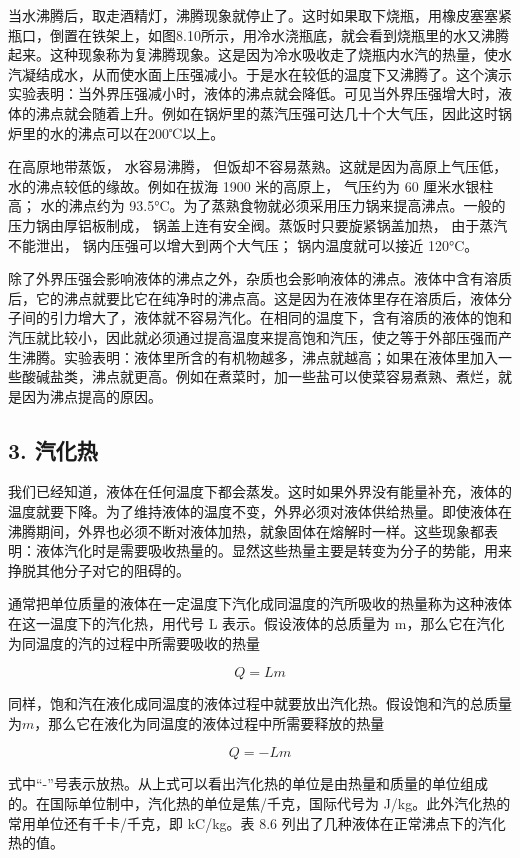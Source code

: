 当水沸腾后，取走酒精灯，沸腾现象就停止了。这时如果取下烧瓶，用橡皮塞塞紧瓶口，倒置在铁架上，如图8.10所示，用冷水浇瓶底，就会看到烧瓶里的水又沸腾起来。这种现象称为复沸腾现象。这是因为冷水吸收走了烧瓶内水汽的热量，使水汽凝结成水，从而使水面上压强减小。于是水在较低的温度下又沸腾了。这个演示实验表明：当外界压强减小时，液体的沸点就会降低。可见当外界压强增大时，液体的沸点就会随着上升。例如在锅炉里的蒸汽压强可达几十个大气压，因此这时锅炉里的水的沸点可以在200℃以上。

在高原地带蒸饭， 水容易沸腾， 但饭却不容易蒸熟。这就是因为高原上气压低，
水的沸点较低的缘故。例如在拔海 1900 米的高原上， 气压约为 60
厘米水银柱高； 水的沸点约为
93.5°C。为了蒸熟食物就必须采用压力锅来提高沸点。一般的压力锅由厚铝板制成，
锅盖上连有安全阀。蒸饭时只要旋紧锅盖加热， 由于蒸汽不能泄出，
锅内压强可以增大到两个大气压； 锅内温度就可以接近 120°C。

除了外界压强会影响液体的沸点之外，杂质也会影响液体的沸点。液体中含有溶质后，它的沸点就要比它在纯净时的沸点高。这是因为在液体里存在溶质后，液体分子间的引力增大了，液体就不容易汽化。在相同的温度下，含有溶质的液体的饱和汽压就比较小，因此就必须通过提高温度来提高饱和汽压，使之等于外部压强而产生沸腾。实验表明：液体里所含的有机物越多，沸点就越高；如果在液体里加入一些酸碱盐类，沸点就更高。例如在煮菜时，加一些盐可以使菜容易煮熟、煮烂，就是因为沸点提高的原因。

\subsection{3. 汽化热}\label{ux6c7dux5316ux70ed}

我们已经知道，液体在任何温度下都会蒸发。这时如果外界没有能量补充，液体的温度就要下降。为了维持液体的温度不变，外界必须对液体供给热量。即使液体在沸腾期间，外界也必须不断对液体加热，就象固体在熔解时一样。这些现象都表明：液体汽化时是需要吸收热量的。显然这些热量主要是转变为分子的势能，用来挣脱其他分子对它的阻碍的。

通常把单位质量的液体在一定温度下汽化成同温度的汽所吸收的热量称为这种液体在这一温度下的汽化热，用代号
L 表示。假设液体的总质量为
m，那么它在汽化为同温度的汽的过程中所需要吸收的热量

\[
Q = L m \tag {8.3}
\]

同样，饱和汽在液化成同温度的液体过程中就要放出汽化热。假设饱和汽的总质量为\(m\)，那么它在液化为同温度的液体过程中所需要释放的热量

\[
Q = - L m \tag {8.4}
\]

式中``-''号表示放热。从上式可以看出汽化热的单位是由热量和质量的单位组成的。在国际单位制中，汽化热的单位是焦/千克，国际代号为
J/kg。此外汽化热的常用单位还有千卡/千克，即 kC/kg。表 8.6
列出了几种液体在正常沸点下的汽化热的值。

